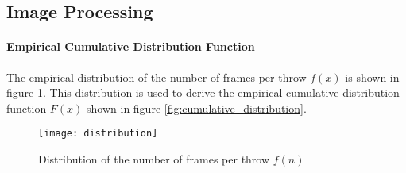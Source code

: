 \subsection{Image Processing}
\label{subsec:inference:app:image_processing}


\paragraph{Empirical Cumulative Distribution Function}
The empirical distribution of the number of frames per throw $f(x)$ is shown in figure \ref{fig:distribution}.
This distribution is used to derive the empirical cumulative distribution function $F(x)$ shown in figure \ref{fig:cumulative_distribution}.

\begin{figure}
  \centering
  \texttt{[image: distribution]}
  \caption{Distribution of the number of frames per throw $f(n)$}
  \label{fig:distribution}
\end{figure}

